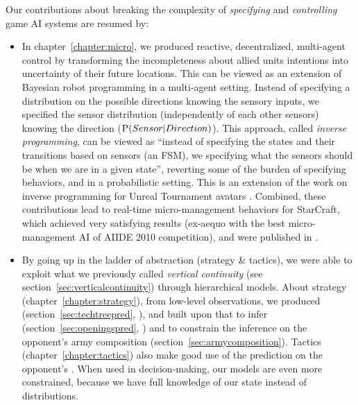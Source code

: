 Our contributions about breaking the complexity of \textit{specifying} and \textit{controlling} game AI systems are resumed by:
\begin{itemize}
    \item In chapter~\ref{chapter:micro}, we produced reactive, decentralized, multi-agent control by transforming the incompleteness about allied units intentions into uncertainty of their future locations. This can be viewed as an extension of Bayesian robot programming \citep{Lebeltel04} in a multi-agent setting. Instead of specifying a distribution on the possible directions knowing the sensory inputs, we specified the sensor distribution (independently of each other sensors) knowing the direction ($\mathrm{P}(Sensor|Direction)$). This approach, called \textit{inverse programming}, can be viewed as ``instead of specifying the states and their transitions based on sensors (an FSM), we specifying what the sensors should be when we are in a given state'', reverting some of the burden of specifying behaviors, and in a probabilistic setting. This is an extension of the work on inverse programming for Unreal Tournament avatars \citep{LeHy04}. Combined, these contributions lead to real-time micro-management behaviors for StarCraft, which achieved very satisfying results (ex-aequo with the best micro-management AI of AIIDE 2010 competition), and were published in \citep{SYNNAEVE:Micro}.

    \item By going up in the ladder of abstraction (strategy \& tactics), we were able to exploit what we previously called \textit{vertical continuity} (see section~\ref{sec:verticalcontinuity}) through hierarchical models. About strategy (chapter~\ref{chapter:strategy}), from low-level observations, we produced  (section~\ref{sec:techtreepred}, \citep{SYNNAEVE:StratPred}), and built upon that to infer  (section~\ref{sec:openingspred}, \citep{SYNNAEVE:OpeningPred}) and to constrain the inference on the opponent's army composition (section~\ref{sec:armycomposition}). Tactics (chapter~\ref{chapter:tactics}) also make good use of the prediction on the opponent's . When used in decision-making, our models are even more constrained, because we have full knowledge of our state instead of distributions.


\end{itemize}
